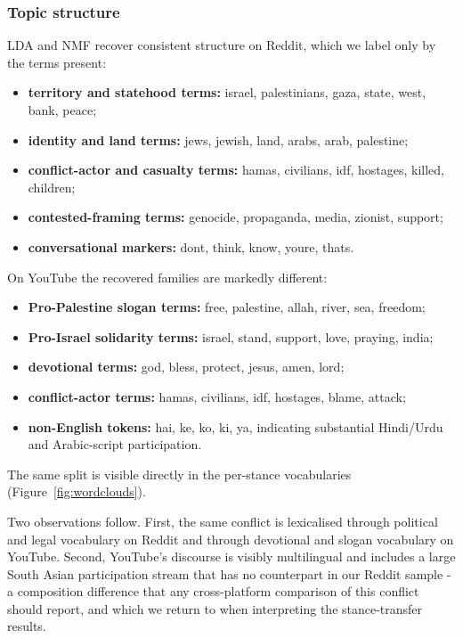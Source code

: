 \documentclass[pdflatex,sn-basic,Numbered,iicol]{sn-jnl}
\begin{document}
\subsubsection{Topic structure}
LDA and NMF recover consistent structure on Reddit, which we label only by the
terms present:
\begin{itemize}[leftmargin=1.2em,itemsep=1pt,topsep=2pt]
  \item \textbf{territory and statehood terms:} israel, palestinians, gaza, state, west, bank, peace;
  \item \textbf{identity and land terms:} jews, jewish, land, arabs, arab, palestine;
  \item \textbf{conflict-actor and casualty terms:} hamas, civilians, idf, hostages, killed, children;
  \item \textbf{contested-framing terms:} genocide, propaganda, media, zionist, support;
  \item \textbf{conversational markers:} dont, think, know, youre, thats.
\end{itemize}
On YouTube the recovered families are markedly different:
\begin{itemize}[leftmargin=1.2em,itemsep=1pt,topsep=2pt]
  \item \textbf{Pro-Palestine slogan terms:} free, palestine, allah, river, sea, freedom;
  \item \textbf{Pro-Israel solidarity terms:} israel, stand, support, love, praying, india;
  \item \textbf{devotional terms:} god, bless, protect, jesus, amen, lord;
  \item \textbf{conflict-actor terms:} hamas, civilians, idf, hostages, blame, attack;
  \item \textbf{non-English tokens:} hai, ke, ko, ki, ya, indicating substantial
  Hindi/Urdu and Arabic-script participation.
\end{itemize}
The same split is visible directly in the per-stance vocabularies
(Figure~\ref{fig:wordclouds}).

Two observations follow. First, the same conflict is lexicalised through political
and legal vocabulary on Reddit and through devotional and slogan vocabulary on
YouTube. Second, YouTube's discourse is visibly multilingual and includes a large
South Asian participation stream that has no counterpart in our Reddit sample - a
composition difference that any cross-platform comparison of this conflict should
report, and which we return to when interpreting the stance-transfer results.
\end{document}
